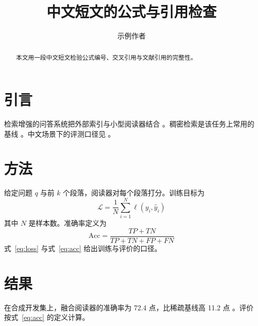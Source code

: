 \documentclass[UTF8]{ctexart}
\title{中文短文的公式与引用检查}
\author{示例作者}
\date{}
\begin{document}
\maketitle

\begin{abstract}
本文用一段中文短文检验公式编号、交叉引用与文献引用的完整性。
\end{abstract}

\section{引言}
\label{sec:intro}
检索增强的问答系统把外部索引与小型阅读器结合
\citep{lewis2020rag}。稠密检索是该任务上常用的基线
\citep{karpukhin2020dpr}。中文场景下的评测口径见 \citet{zhao2019zh}。

\section{方法}
\label{sec:method}
给定问题 $q$ 与前 $k$ 个段落，阅读器对每个段落打分。训练目标为
\begin{equation}
  \label{eq:loss}
  \mathcal{L} = \frac{1}{N} \sum_{i=1}^{N} \ell(y_i, \hat{y}_i)
\end{equation}
其中 $N$ 是样本数。准确率定义为
\begin{equation}
  \label{eq:acc}
  \mathrm{Acc} = \frac{TP + TN}{TP + TN + FP + FN}
\end{equation}
式~\ref{eq:loss} 与式~\ref{eq:acc} 给出训练与评价的口径。

\section{结果}
\label{sec:results}
在合成开发集上，融合阅读器的准确率为 72.4 点，比稀疏基线高 11.2 点
\citep{lewis2020rag}。评价按式~\ref{eq:acc} 的定义计算。



\end{document}
